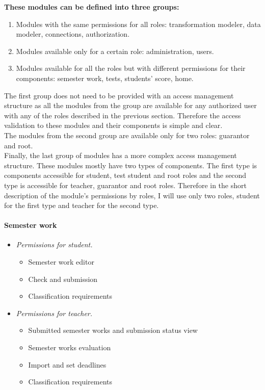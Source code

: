 \noindent \textbf{These modules can be defined into three groups:}

\begin{enumerate}
    \item Modules with the same permissions for all roles: transformation modeler, data modeler, connections, authorization.
    \item Modules available only for a certain role: administration, users.
    \item Modules available for all the roles but with different permissions for their components: semester work, tests, students' score, home.
\end{enumerate}

\noindent The first group does not need to be provided with an access management structure as all the modules from the group are available for any authorized user with any of the roles described in the previous section. Therefore the access validation to these modules and their components is simple and clear.\\
The modules from the second group are available only for two roles: guarantor and root.\\
Finally, the last group of modules has a more complex access management structure. These modules mostly have two types of components. The first type is components accessible for student, test student and root roles and the second type is accessible for teacher, guarantor and root roles. Therefore in the short description of the module's permissions by roles, I will use only two roles, student for the first type and teacher for the second type.

\paragraph*{Semester work}
\begin{itemize}
    \item \emph{Permissions for student.} 
        \begin{itemize}
            \item Semester work editor
            \item Check and submission
            \item Classification requirements
        \end{itemize}
    \item \emph{Permissions for teacher.}
        \begin{itemize}
            \item Submitted semester works and submission status view
            \item Semester works evaluation
            \item Import and set deadlines
            \item Classification requirements
        \end{itemize}
\end{itemize}

